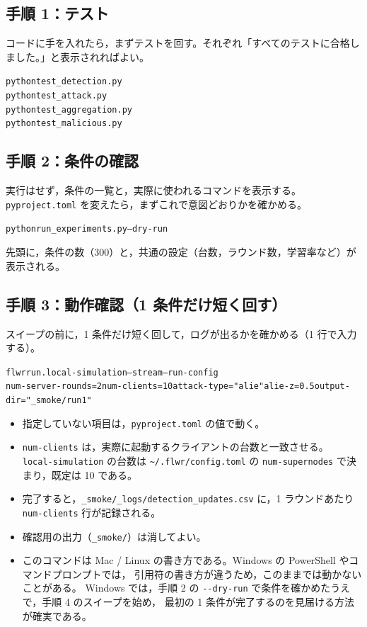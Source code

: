 \documentclass[a4j, dvipdfmx]{jsarticle}  %
\newenvironment{cmd}{\par\vspace{0.3em}\begin{alltt}\small}{\end{alltt}\vspace{0.3em}\par}
\begin{document}
\subsection{手順 1：テスト}

コードに手を入れたら，まずテストを回す。それぞれ「すべてのテストに合格しました。」と表示されればよい。

\begin{cmd}
python test_detection.py
python test_attack.py
python test_aggregation.py
python test_malicious.py
\end{cmd}

\subsection{手順 2：条件の確認}

実行はせず，条件の一覧と，実際に使われるコマンドを表示する。
\texttt{pyproject.toml} を変えたら，まずこれで意図どおりかを確かめる。

\begin{cmd}
python run_experiments.py --dry-run
\end{cmd}

先頭に，条件の数（300）と，共通の設定（台数，ラウンド数，学習率など）が表示される。

\subsection{手順 3：動作確認（1 条件だけ短く回す）}
\label{sec:run-single}

スイープの前に，1 条件だけ短く回して，ログが出るかを確かめる（1 行で入力する）。

\begin{cmd}
flwr run . local-simulation --stream --run-config
    \textquotesingle{}num-server-rounds=2 num-clients=10 attack-type="alie" alie-z=0.5 output-dir="_smoke/run1"\textquotesingle{}
\end{cmd}

\begin{itemize}
  \item 指定していない項目は，\texttt{pyproject.toml} の値で動く。
  \item \texttt{num-clients} は，実際に起動するクライアントの台数と一致させる。
        \texttt{local-simulation} の台数は \texttt{\textasciitilde/.flwr/config.toml} の \texttt{num-supernodes} で決まり，既定は 10 である。
  \item 完了すると，\texttt{\_smoke/\_logs/detection\_updates.csv} に，1 ラウンドあたり \texttt{num-clients} 行が記録される。
  \item 確認用の出力（\texttt{\_smoke/}）は消してよい。
  \item このコマンドは Mac / Linux の書き方である。Windows の PowerShell やコマンドプロンプトでは，
        引用符の書き方が違うため，このままでは動かないことがある。
        Windows では，手順 2 の \texttt{-{}-dry-run} で条件を確かめたうえで，手順 4 のスイープを始め，
        最初の 1 条件が完了するのを見届ける方法が確実である。
\end{itemize}
\end{document}
